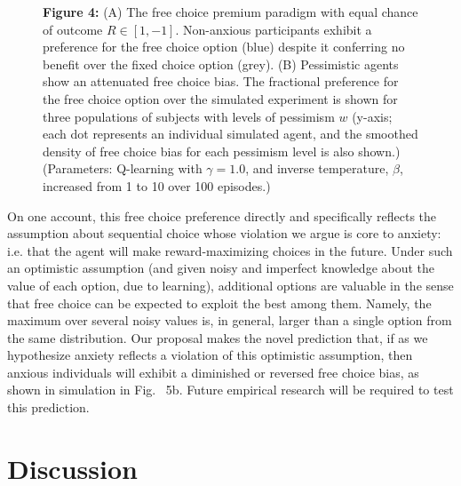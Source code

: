 \documentclass[11pt]{article} %
\begin{document}
\begin{figure}[!b]
  \centerline{%
  }
  \par \textbf{Figure 4:} (A) The free choice premium paradigm\cite{Leotti2011,Leotti2014} with equal chance of outcome $R \in [1, -1]$. Non-anxious participants exhibit a preference for the free choice option (blue) despite it conferring no benefit over the fixed choice option (grey). (B) Pessimistic agents show an attenuated free choice bias. The fractional preference for the free choice option over the simulated experiment is shown for three populations of subjects with levels of pessimism $w$ (y-axis; each dot represents an individual simulated agent, and the smoothed density of free choice bias for each pessimism level is also shown.)
  (Parameters: Q-learning with $\gamma = 1.0$, and inverse temperature, $\beta$, increased from 1 to 10 over 100 episodes.)
\end{figure}

On one account\citep{ly2019}, this free choice preference directly and specifically reflects the assumption about sequential choice whose violation we argue is core to anxiety: i.e. that the agent will make reward-maximizing choices in the future. Under such an optimistic assumption (and given noisy and imperfect knowledge about the value of each option, due to learning), additional options are valuable in the sense that free choice can be expected to exploit the best among them. Namely, the maximum over several noisy values is, in general, larger than a single option from the same distribution. Our proposal makes the novel prediction that, if as we hypothesize anxiety reflects a violation of this optimistic assumption, then anxious individuals will exhibit a diminished or reversed free choice bias, as shown in simulation in Fig. ~5b. Future empirical research will be required to test this prediction.

\section{Discussion}
\end{document}
